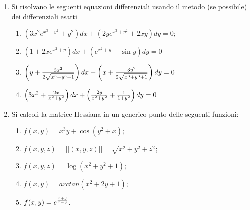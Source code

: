 \begin{enumerate}
\begin{enumerate}
\end{enumerate}
\item Si risolvano le seguenti equazioni differenziali usando il metodo (se
possibile) dei differenziali esatti
\begin{enumerate}
\item $\left(3x^2e^{x^3+y^2}+y^2\right)dx+\left(2ye^{x^3+y^2}+2xy\right)dy=0;$ 
\item $\left(1+2xe^{x^2+y}\right)dx+\left(e^{x^2+y}-\sin y\right)dy=0$
\item $\left(y+{3x^2\over 2\sqrt{x^3+y^3+1}}\right)dx+
\left(x+{3y^2\over2\sqrt{x^3+y^3+1}}\right)dy=0$
\item $\left(3x^2+{2x\over x^2+y^2}\right)dx+\left({2y\over x^2+y^2}+
{1\over1+y^2}\right)dy=0$ %
\end{enumerate}
\item Si calcoli la matrice Hessiana in un generico punto delle seguenti
funzioni:
\begin{enumerate}
\item $f(x,y)=x^3y+\cos(y^2+x)$;
\item $f(x,y,z)=||(x,y,z)||=\sqrt{x^2+y^2+z^2}$;
\item $f(x,y,z)=\log(x^2+y^2+1)$;
\item $f(x,y)=arctan(x^2+2y+1)$;
\item $f(x,y)=e^{x+y\over x-y}$. 
\end{enumerate}
\end{enumerate}

